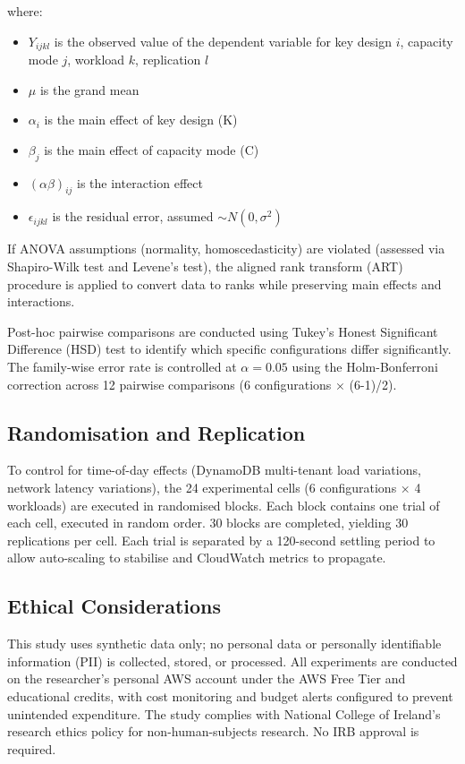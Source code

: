 where:
\begin{itemize}
    \item $Y_{ijkl}$ is the observed value of the dependent variable for key design $i$, capacity mode $j$, workload $k$, replication $l$
    \item $\mu$ is the grand mean
    \item $\alpha_i$ is the main effect of key design (K)
    \item $\beta_j$ is the main effect of capacity mode (C)
    \item $(\alpha\beta)_{ij}$ is the interaction effect
    \item $\epsilon_{ijkl}$ is the residual error, assumed $\sim N(0, \sigma^2)$
\end{itemize}

If ANOVA assumptions (normality, homoscedasticity) are violated (assessed via Shapiro-Wilk test and Levene's test), the aligned rank transform (ART) procedure \citep{wobbrock2011aligned} is applied to convert data to ranks while preserving main effects and interactions.

Post-hoc pairwise comparisons are conducted using Tukey's Honest Significant Difference (HSD) test to identify which specific configurations differ significantly. The family-wise error rate is controlled at $\alpha = 0.05$ using the Holm-Bonferroni correction across 12 pairwise comparisons (6 configurations × (6-1)/2).

\subsection{Randomisation and Replication}

To control for time-of-day effects (DynamoDB multi-tenant load variations, network latency variations), the 24 experimental cells (6 configurations × 4 workloads) are executed in randomised blocks. Each block contains one trial of each cell, executed in random order. 30 blocks are completed, yielding 30 replications per cell. Each trial is separated by a 120-second settling period to allow auto-scaling to stabilise and CloudWatch metrics to propagate.

\subsection{Ethical Considerations}

This study uses synthetic data only; no personal data or personally identifiable information (PII) is collected, stored, or processed. All experiments are conducted on the researcher's personal AWS account under the AWS Free Tier and educational credits, with cost monitoring and budget alerts configured to prevent unintended expenditure. The study complies with National College of Ireland's research ethics policy for non-human-subjects research. No IRB approval is required.

